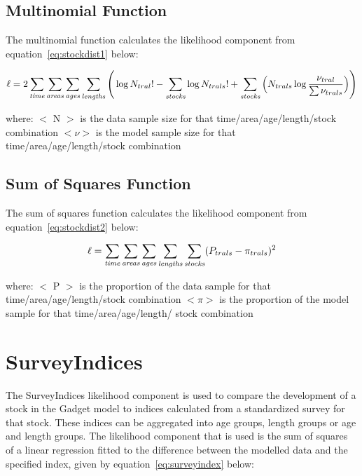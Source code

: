 \documentclass [a4paper, 10pt]{book}
\begin{document}
\subsection{Multinomial Function}
The multinomial function calculates the likelihood component from equation~\ref{eq:stockdist1} below:

\begin{equation}\label{eq:stockdist1}
\ell = 2 \sum_{\it time}\sum_{\it areas}\sum_{\it ages}\sum_{\it lengths} \Bigg( \log N_{tral}! - \sum_{\it stocks} \log N_{trals}! + \sum_{\it stocks} \Big( N_{trals} \log {\frac{\nu_{tral}}{\sum \nu_{trals}}} \Big)\Bigg)
\end{equation}

where:\newline
$<$ N $>$ is the data sample size for that time/area/age/length/stock combination\newline
$<\nu>$ is the model sample size for that time/area/age/length/stock combination

\subsection{Sum of Squares Function}
The sum of squares function calculates the likelihood component from equation~\ref{eq:stockdist2} below:

\begin{equation}\label{eq:stockdist2}
\ell = \sum_{\it time}\sum_{\it areas}\sum_{\it ages}\sum_{\it lengths}\sum_{\it stocks} ( P_{trals} - \pi_{trals} ) ^2
\end{equation}

where:\newline
$<$ P $>$ is the proportion of the data sample for that time/area/age/length/stock combination\newline
$<\pi>$ is the proportion of the model sample for that time/area/age/length/ stock combination

\section{SurveyIndices}\label{sec:surveyindices}
The SurveyIndices likelihood component is used to compare the development of a stock in the Gadget model to indices calculated from a standardized survey for that stock.  These indices can be aggregated into age groups, length groups or age and length groups.  The likelihood component that is used is the sum of squares of a linear regression fitted to the difference between the modelled data and the specified index, given by equation~\ref{eq:surveyindex} below:
\end{document}
